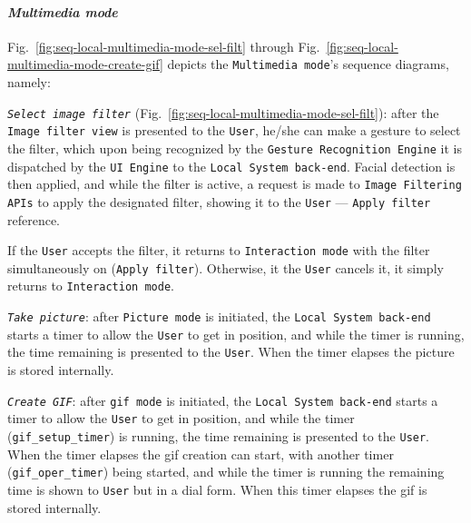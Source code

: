 \paragraph{\emph{Multimedia mode}}
Fig.~\ref{fig:seq-local-multimedia-mode-sel-filt} through
Fig.~\ref{fig:seq-local-multimedia-mode-create-gif} depicts the
\texttt{Multimedia mode}'s sequence diagrams, namely:
\begin{item-c}
\item \emph{\texttt{Select image filter}} (Fig.~\ref{fig:seq-local-multimedia-mode-sel-filt}): after the \texttt{Image
  filter view} is presented to the \texttt{User}, he/she can make a gesture to
select the filter, which upon being recognized by the \texttt{Gesture
  Recognition Engine} it is dispatched by the \texttt{UI Engine} to the
\texttt{Local System back-end}. Facial detection is then applied, and while
the filter is active, a request is made to \texttt{Image Filtering APIs} to
apply the designated filter, showing it to the \texttt{User} --- \texttt{Apply
  filter} reference.

If the \texttt{User} accepts the filter, it returns to \texttt{Interaction mode}
with the filter simultaneously on (\texttt{Apply filter}). Otherwise, it the
\texttt{User} cancels it, it simply returns to \texttt{Interaction mode}.
% 
\item \emph{\texttt{Take picture}}: after \texttt{Picture mode} is initiated,
  the \texttt{Local System back-end} starts a timer to allow the \texttt{User}
  to get in position, and while the timer is running, the time remaining is
  presented to the \texttt{User}. When the timer elapses the picture is stored
  internally.
%
\item \emph{\texttt{Create GIF}}: after \texttt{\gls{gif} mode} is initiated,
  the \texttt{Local System back-end} starts a timer to allow the \texttt{User}
  to get in position, and while the timer (\texttt{gif\_setup\_timer}) is running, the time remaining is
  presented to the \texttt{User}. When the timer elapses the \gls{gif} creation
  can start, with another timer (\texttt{gif\_oper\_timer}) being started, and while the timer is running
  the remaining time is shown to \texttt{User} but in a dial form. When this
  timer elapses the \gls{gif} is stored internally.
\end{item-c}
%
